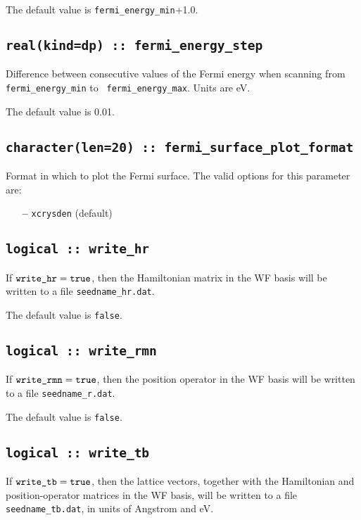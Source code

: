The default value is {\tt fermi\_energy\_min}+1.0.

\subsection[fermi\_energy]{\tt real(kind=dp) :: fermi\_energy\_step}
Difference between consecutive values of the Fermi energy when
scanning from {\tt fermi\_energy\_min} to {\tt
  fermi\_energy\_max}. Units are eV.

The default value is 0.01.


\subsection[fermi\_surface\_plot\_format]{\tt character(len=20) ::
  fermi\_surface\_plot\_format} 

Format in which to plot the Fermi surface. 
The valid options for this parameter are:
\begin{itemize}
\item[{\bf --}] \verb#xcrysden#  (default)
\end{itemize}

\subsection[write\_hr]{\tt logical :: write\_hr}

If $\verb#write_hr#=\verb#true#$, then the Hamiltonian matrix in the
WF basis will be written to a file {\tt seedname\_hr.dat}.

The default value is {\tt false}.

\subsection[write\_rmn]{\tt logical :: write\_rmn}

If $\verb#write_rmn#=\verb#true#$, then the position operator in the
WF basis will be written to a file {\tt seedname\_r.dat}.

The default value is {\tt false}.

\subsection[write\_tb]{\tt logical :: write\_tb}

If $\verb#write_tb#=\verb#true#$, then the lattice vectors, together
with the Hamiltonian and position-operator matrices in the WF basis,
will be written to a file {\tt seedname\_tb.dat}, in units
of Angstrom and eV.

